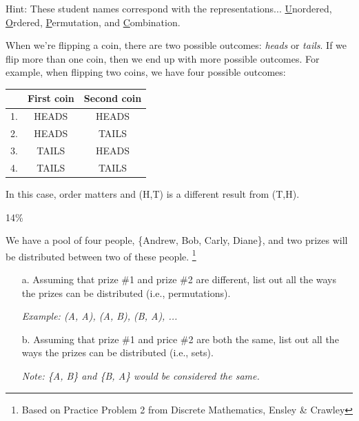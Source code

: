 \documentclass[a4paper,12pt]{book}
\begin{document}
        \begin{hint}{Hint:}
            These student names correspond with the representations...
            \underline{U}nordered, \underline{O}rdered, \underline{P}ermutation,
            and \underline{C}ombination.            
        \end{hint}


        \hrulefill

        \begin{introNOHEAD}
            When we're flipping a coin, there are two possible outcomes:
            \textit{heads} or \textit{tails}. If we flip more than one
            coin, then we end up with more possible outcomes. For example,
            when flipping two coins, we have four possible outcomes:

            \begin{center}
                \begin{tabular}{ | l | c | c | }
                    \hline
                    & First coin & Second coin \\ \hline
                    1. & HEADS & HEADS \\ \hline
                    2. & HEADS & TAILS \\ \hline
                    3. & TAILS & HEADS \\ \hline
                    4. & TAILS & TAILS \\ \hline
                \end{tabular}
            \end{center}

            In this case, order matters and (H,T) is a different result
            from (T,H).
        \end{introNOHEAD}
        
        \begin{question}{4}{14\%}

            We have a pool of four people, \{Andrew, Bob, Carly, Diane\}, and two prizes will be distributed
            between two of these people.
            \footnote{Based on Practice Problem 2 from Discrete Mathematics, Ensley \& Crawley}

            \begin{enumerate}
                \item[a.] Assuming that prize \#1 and prize \#2 are different, list out
                all the ways the prizes can be distributed (i.e., permutations).

                \textit{Example: (A, A), (A, B), (B, A), ...}

                \item[b.] Assuming that prize \#1 and price \#2 are both the same,
                list out all the ways the prizes can be distributed (i.e., sets).

                \textit{Note: \{A, B\} and \{B, A\} would be considered the same.}
            \end{enumerate}
            
        \end{question}
        
\end{document}
